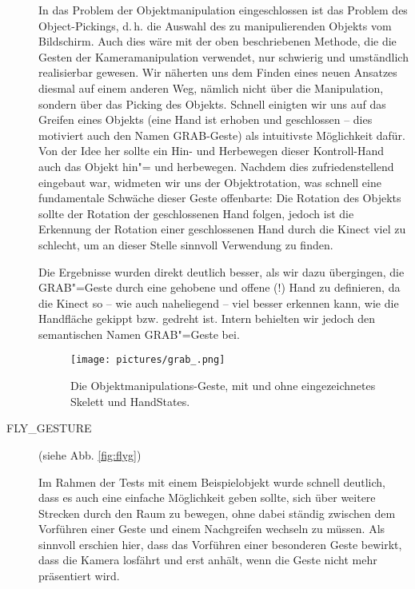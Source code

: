\begin{description}
		In das Problem der Objektmanipulation eingeschlossen ist das Problem des Object-Pickings, d.\,h. die Auswahl des zu manipulierenden Objekts vom Bildschirm. Auch dies wäre mit der oben beschriebenen Methode, die die Gesten der Kameramanipulation verwendet, nur schwierig und umständlich realisierbar gewesen. Wir näherten uns dem Finden eines neuen Ansatzes diesmal auf einem anderen Weg, nämlich nicht über die Manipulation, sondern über das Picking des Objekts. Schnell einigten wir uns auf das Greifen eines Objekts (eine Hand ist erhoben und geschlossen -- dies motiviert auch den Namen \glqq GRAB\grqq-Geste) als intuitivste Möglichkeit dafür. Von der Idee her sollte ein Hin- und Herbewegen dieser \glqq Kontroll-Hand\grqq{} auch das Objekt hin"= und herbewegen. Nachdem dies zufriedenstellend eingebaut war, widmeten wir uns der Objektrotation, was schnell eine fundamentale Schwäche dieser Geste offenbarte: Die Rotation des Objekts sollte der Rotation der geschlossenen Hand folgen, jedoch ist die Erkennung der Rotation einer geschlossenen Hand durch die Kinect viel zu schlecht, um an dieser Stelle sinnvoll Verwendung zu finden.\par 
		Die Ergebnisse wurden direkt deutlich besser, als wir dazu übergingen, die GRAB"=Geste durch eine gehobene und offene (!) Hand zu definieren, da die Kinect so -- wie auch naheliegend -- viel besser erkennen kann, wie die Handfläche gekippt bzw. gedreht ist. Intern behielten wir jedoch den semantischen Namen \glqq GRAB\grqq"=Geste bei.
		\begin{figure}[h!]
		\centering
		\texttt{[image: pictures/grab\_.png]}
		\caption{Die Objektmanipulations-Geste, mit und ohne eingezeichnetes Skelett und HandStates.}\label{fig:grabg}
		\end{figure}
		\par
		\item[FLY\_GESTURE] (siehe Abb. \ref{fig:flyg})\par
		Im Rahmen der Tests mit einem Beispielobjekt wurde schnell deutlich, dass es auch eine einfache Möglichkeit geben sollte, sich über weitere Strecken durch den Raum zu bewegen, ohne dabei ständig zwischen dem Vorführen einer Geste und einem \glqq Nachgreifen\grqq{} wechseln zu müssen. Als sinnvoll erschien hier, dass das Vorführen einer besonderen Geste bewirkt, dass die Kamera losfährt und erst anhält, wenn die Geste nicht mehr präsentiert wird.\par 

\end{description}
